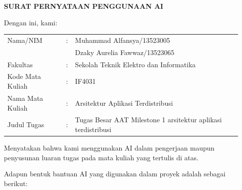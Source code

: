 \clearpage
{}
{}
\label{sec:ai}
\begin{center}
{\Large\bfseries SURAT PERNYATAAN PENGGUNAAN AI\par}
\end{center}

Dengan ini, kami:

{\setlength{\tabcolsep}{2pt}
\begin{tabular}{@{}p{0.24\linewidth}p{0.03\linewidth}p{0.68\linewidth}@{}}
Nama/NIM & : & Muhammad Alfansya/13523005\\
          &   & Dzaky Aurelia Fawwaz/13523065\\
Fakultas & : & Sekolah Teknik Elektro dan Informatika\\
Kode Mata Kuliah & : & IF4031\\
Nama Mata Kuliah & : & Arsitektur Aplikasi Terdistribusi\\
Judul Tugas & : & Tugas Besar AAT Milestone 1 arsitektur aplikasi terdistribusi
\end{tabular}
}

\vspace{6mm}
Menyatakan bahwa kami menggunakan AI dalam pengerjaan maupun penyusunan luaran tugas pada mata kuliah yang tertulis di atas.

\vspace{4mm}
Adapun bentuk bantuan AI yang digunakan dalam proyek adalah sebagai berikut:

